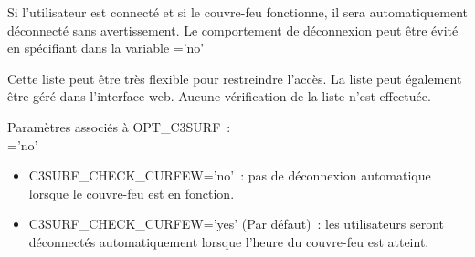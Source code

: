 \begin{description}
  Si l'utilisateur est connecté et si le couvre-feu fonctionne, il sera
  automatiquement déconnecté sans avertissement. Le comportement de
  déconnexion peut être évité en spécifiant dans la variable
  ='no'

  Cette liste peut être très flexible pour restreindre l'accès. La liste
  peut également être géré dans l'interface web. Aucune vérification de
  la liste n'est effectuée. 

  Paramètres associés à OPT\_C3SURF~:\\
  ='no'
    \begin{itemize}
        \item{C3SURF\_CHECK\_CURFEW='no'}~: pas de déconnexion automatique lorsque
		le couvre-feu est en fonction.
        \item{C3SURF\_CHECK\_CURFEW='yes'} (Par défaut)~: les utilisateurs seront déconnectés
		automatiquement lorsque l'heure du couvre-feu est atteint.
    \end{itemize}
\end{description}
